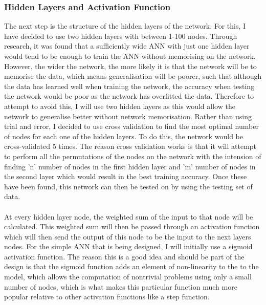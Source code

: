 \documentclass[11pt]{article}
\begin{document}
\subsubsection{Hidden Layers and Activation Function }
The next step is the structure of the hidden layers of the network.  For this, I have decided to use two hidden layers with between 1-100 nodes. Through research, it was found that a sufficiently wide ANN with just one hidden layer would tend to be enough to train the ANN without memorising on the network. However, the wider the network, the more likely it is that the network will be to memorise the data, which means generalisation will be poorer, such that although the data has learned well when training the network, the accuracy when testing the network would be poor as the network has overfitted the data. Therefore to attempt to avoid this, I will use two hidden layers as this would allow the network to generalise better without network memorisation. Rather than using trial and error, I decided to use cross validation to find the most optimal number of nodes for each one of the hidden layers. To do this, the network would be cross-validated 5 times. The reason cross validation works is that it will attempt to perform all the permutations of the nodes on the network with the intension of finding 'n' number of nodes in the first hidden layer and 'm' number of nodes in the second layer which would result in the best training accuracy. Once these have been found, this network can then be tested on by using the testing set of data. \\
\\
At every hidden layer node, the weighted sum of the input to that node will be calculated. This weighted sum will then be passed through an activation function which will then send the output of this node to be the input to the next layers nodes. For the simple ANN that is being designed, I will initially use a sigmoid activation function. The reason this is a good idea and should be part of the design is that the sigmoid function adds an element of non-linearity to the to the model, which allows the computation of nontrivial problems using only a small number of nodes, which is what makes this particular function much more popular relative to other activation functions like a step function. 
\end{document}
